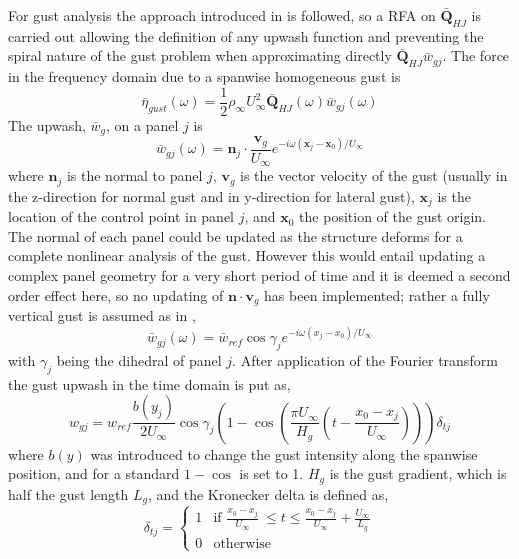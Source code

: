 \documentclass[11pt]{article}
\begin{document}
For gust analysis the approach introduced in \cite{Kier2009} is followed, so a RFA on $\bar{\bm{Q}}_{HJ}$ is carried out allowing the definition of any upwash function and preventing the spiral nature of the gust problem when approximating directly $\bar{\bm{Q}}_{HJ} \bar{w}_{gj}$. The force in the frequency domain due to a spanwise homogeneous gust is
%
\begin{equation}
\bar{\eta}_{gust}(\omega) = \frac12 \rho_\infty U_\infty^2  \bar{\bm{Q}}_{HJ}(\omega)\bar{w}_{gj}(\omega)
\end{equation}
The upwash, $\bar{w}_{g}$, on a panel $j$ is 
%
\begin{equation}
\bar{w}_{gj}(\omega) = \bm{n}_j \cdot \frac{\bm{v}_g}{U_\infty} e^{-i\omega(\bm{x}_j-\bm{x}_0)/U_\infty}
\end{equation}
where $\bm{n}_j $ is the normal to panel $j$, $\bm{v}_g$ is the vector velocity of the gust (usually in the z-direction for normal gust and in y-direction for lateral gust), $\bm{x}_j$ is the location of the control point in panel $j$, and $\bm{x}_0$ the position of the gust origin. The normal of each panel could be updated as the structure deforms for a complete nonlinear analysis of the gust. However this would entail updating a complex panel geometry for a very short period of time and it is deemed a second order effect here, so no updating of $\bm{n} \cdot \bm{v}_g$ has been implemented; rather a fully vertical gust is assumed as in \cite{Castrichini2016},
%
\begin{equation}
\bar{w}_{gj}(\omega) = \bar{w}_{ref}\cos \gamma_j e^{-i\omega(x_j-x_0)/U_\infty}
\end{equation}
with $\gamma_j$ being the dihedral of panel $j$. After application of the Fourier transform the gust upwash in the time domain is put as,
%
\begin{equation}\label{eq3:gust_time}
w_{gj} = w_{ref}\frac{\mathit{b}(y_j)}{2U_\infty} \cos \gamma_j \left(1-\cos \left(\frac{\pi U_\infty}{H_g}\left(t-\frac{x_0-x_j}{U_\infty}\right)\right)\right)\delta_{tj}
\end{equation}
where $b(y)$ was introduced to change the gust intensity along the spanwise position, and for a standard $1-\cos$ is set to 1. $H_g$ is the gust gradient, which is half the gust length $L_g$, and the  Kronecker delta is defined as, 
\begin{equation}
 \delta_{tj} =
    \begin{cases}
     1 & \text{if $\frac{x_0-x_j}{U_\infty}\ \leq t \leq \frac{x_0-x_j}{U_\infty}+\frac{U_\infty}{L_g}$}\\
      0 & \text{otherwise}
    \end{cases}       
\end{equation}
\end{document}
